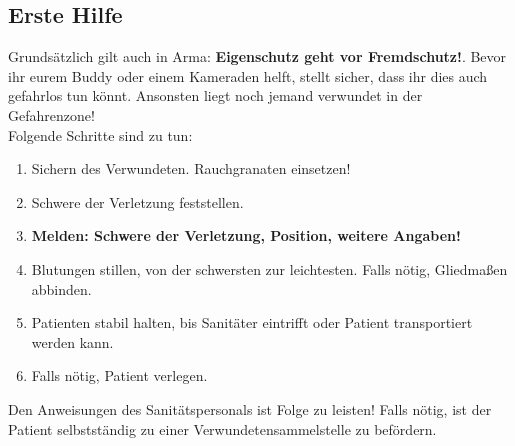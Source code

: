 \subsection{Erste Hilfe}
Grundsätzlich gilt auch in Arma: \textbf{Eigenschutz geht vor Fremdschutz!}. Bevor ihr eurem Buddy oder einem Kameraden helft, stellt sicher, dass ihr dies auch gefahrlos tun könnt. Ansonsten liegt noch jemand verwundet in der Gefahrenzone!\\
Folgende Schritte sind zu tun:
\begin{enumerate}
	\item Sichern des Verwundeten. Rauchgranaten einsetzen!
	\item Schwere der Verletzung feststellen.
	\item \textbf{Melden: Schwere der Verletzung, Position, weitere Angaben!}
	\item Blutungen stillen, von der schwersten zur leichtesten. Falls nötig, Gliedmaßen abbinden.
	\item Patienten stabil halten, bis Sanitäter eintrifft oder Patient transportiert werden kann.
	\item Falls nötig, Patient verlegen.
\end{enumerate}
Den Anweisungen des Sanitätspersonals ist Folge zu leisten! Falls nötig, ist der Patient selbstständig zu einer Verwundetensammelstelle zu befördern.